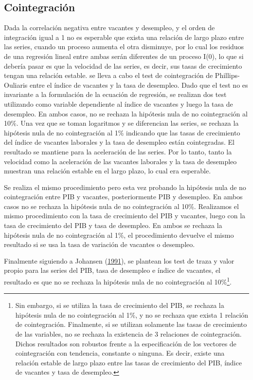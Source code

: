 \documentclass[12pt,oneside]{reedthesis}
\begin{document}
\hypertarget{cointegraciuxf3n}{%
\subsection{Cointegración}\label{cointegraciuxf3n}}

Dada la correlación negativa entre vacantes y desempleo, y el orden de integración igual a 1 no es esperable que exista una relación de largo plazo entre las series, cuando un proceso aumenta el otra disminuye, por lo cual los residuos de una regresión lineal entre ambas serán diferentes de un proceso I(0), lo que si debería pasar es que la velocidad de las series, es decir, sus tasas de crecimiento tengan una relación estable.
se lleva a cabo el test de cointegración de Phillips-Ouliaris entre el índice de vacantes y la tasa de desempleo. Dado que el test no es invariante a la formulación de la ecuación de regresión, se realizan dos test utilizando como variable dependiente al índice de vacantes y luego la tasa de desempleo. En ambos casos, no se rechaza la hipótesis nula de no cointegración al 10\%.
Una vez que se toman logaritmos y se diferencian las series, se rechaza la hipótesis nula de no cointegración al 1\% indicando que las tasas de crecimiento del índice de vacantes laborales y la tasa de desempleo están cointegradas. El resultado se mantiene para la aceleración de las series. Por lo tanto, tanto la velocidad como la aceleración de las vacantes laborales y la tasa de desempleo muestran una relación estable en el largo plazo, lo cual era esperable.

Se realiza el mismo procedimiento pero esta vez probando la hipótesis nula de no cointegración entre PIB y vacantes, posteriormente PIB y desempleo. En ambos casos no se rechaza la hipótesis nula de no cointegración al 10\%. Realizamos el mismo procedimiento con la tasa de crecimiento del PIB y vacantes, luego con la tasa de crecimiento del PIB y tasa de desempleo. En ambos se rechaza la hipótesis nula de no cointegración al 1\%, el procedimiento devuelve el mismo resultado si se usa la tasa de variación de vacantes o desempleo.

Finalmente siguiendo a Johansen (\protect\hyperlink{ref-Johansen1991}{1991}), se plantean los test de traza y valor propio para las series del PIB, tasa de desempleo e índice de vacantes, el resultado es que no se rechaza la hipótesis nula de no cointegración al 10\%\footnote{Sin embargo, si se utiliza la tasa de crecimiento del PIB, se rechaza la hipótesis nula de no cointegración al 1\%, y no se rechaza que exista 1 relación de cointegración. Finalmente, si se utilizan solamente las tasas de crecimiento de las variables, no se rechaza la existencia de 3 relaciones de cointegración. Dichos resultados son robustos frente a la especificación de los vectores de cointegración con tendencia, constante o ninguna. Es decir, existe una relación estable de largo plazo entre las tasas de crecimiento del PIB, índice de vacantes y tasa de desempleo.}.
\end{document}

